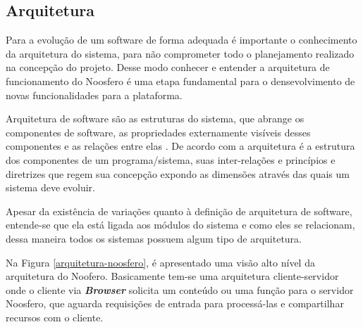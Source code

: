 \subsection{Arquitetura}
\label{arquitetura}
Para a evolução de um software de forma adequada é importante o conhecimento da arquitetura do sistema, para não comprometer todo o planejamento realizado na concepção do projeto. Desse modo conhecer e entender a arquitetura de funcionamento do Noosfero é uma etapa fundamental para o densevolvimento de novas funcionalidades para a plataforma.

Arquitetura de software são as estruturas do sistema, que abrange os componentes de software, as propriedades externamente visíveis desses componentes e as relações entre elas \cite{pressman2011engenharia}. De acordo com  a arquitetura é a estrutura dos componentes de um programa/sistema, suas inter-relações e princípios e diretrizes que regem sua concepção expondo as dimensões através das quais um sistema deve evoluir.

Apesar da existência de variações quanto à definição de arquitetura de software, entende-se que ela está ligada aos módulos do sistema e como eles se relacionam, dessa maneira todos os sistemas possuem algum tipo de arquitetura.

Na Figura \ref{arquitetura-noosfero}, é apresentado uma visão alto nível da arquitetura do Noofero. Basicamente tem-se uma arquitetura cliente-servidor onde o cliente via \textbf{\textit{Browser}} solicita um conteúdo ou uma função para o servidor Noosfero, que aguarda requisições de entrada para processá-las e compartilhar recursos com o cliente.

